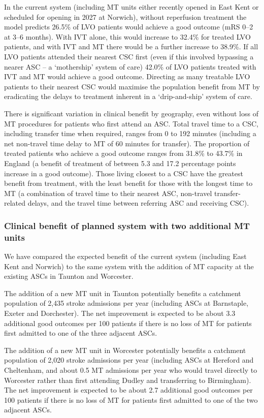 In the current system (including MT units either recently opened in East Kent or scheduled for opening in 2027 at Norwich), without reperfusion treatment the model predicts 26.5\% of LVO patients would achieve a good outcome (mRS 0--2 at 3--6 months). With IVT alone, this would increase to 32.4\% for treated LVO patients, and with IVT and MT there would be a further increase to 38.9\%. If all LVO patients attended their nearest CSC first (even if this involved bypassing a nearer ASC -- a `mothership' system of care) 42.0\% of LVO patients treated with IVT and MT would achieve a good outcome. Directing as many treatable LVO patients to their nearest CSC would maximise the population benefit from MT by eradicating the delays to treatment inherent in a `drip-and-ship' system of care.

There is significant variation in clinical benefit by geography, even without loss of MT procedures for patients who first attend an ASC. Total travel time to a CSC, including transfer time when required, ranges from 0 to 192 minutes (including a net non-travel time delay to MT of 60 minutes for transfer). The proportion of treated patients who achieve a good outcome ranges from 31.8\% to 43.7\% in England (a benefit of treatment of between 5.3 and 17.2 percentage points increase in a good outcome). Those living closest to a CSC have the greatest benefit from treatment, with the least benefit for those with the longest time to MT (a combination of travel time to their nearest ASC, non-travel transfer-related delays, and the travel time between referring ASC and receiving CSC).

\subsubsection{Clinical benefit of planned system with two additional MT units}

We have compared the expected benefit of the current system (including East Kent and Norwich) to the same system with the addition of MT capacity at the existing ASCs in Taunton and Worcester.

The addition of a new MT unit in Taunton potentially benefits a catchment population of 2,435 stroke admissions per year (including ASCs at Barnstaple, Exeter and Dorchester). The net improvement is expected to be about 3.3 additional good outcomes per 100 patients if there is no loss of MT for patients first admitted to one of the three adjacent ASCs.

The addition of a new MT unit in Worcester potentially benefits a catchment population of 2,020 stroke admissions per year (including ASCs at Hereford and Cheltenham, and about 0.5 MT admissions per year who would travel directly to Worcester rather than first attending Dudley and transferring to Birmingham). The net improvement is expected to be about 2.7 additional good outcomes per 100 patients if there is no loss of MT for patients first admitted to one of the two adjacent ASCs.

